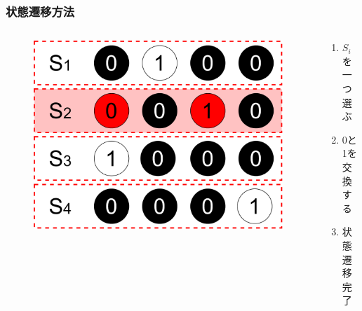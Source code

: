 \begin{frame}
  \frametitle{状態遷移方法}
  \begin{columns}
    \begin{column}{0.6\linewidth}
  \begin{figure}[h]
    \centering
    \includegraphics[width=0.8\linewidth]{data/kanzen1ji_bitflip}
  \end{figure}
    \end{column}
    \begin{column}{0.4\linewidth}
      \begin{enumerate}
        \item $S_i$を一つ選ぶ
        \item 0と1を交換する
        \item 状態遷移完了
      \end{enumerate}
    \end{column}
  \end{columns}
\end{frame}


